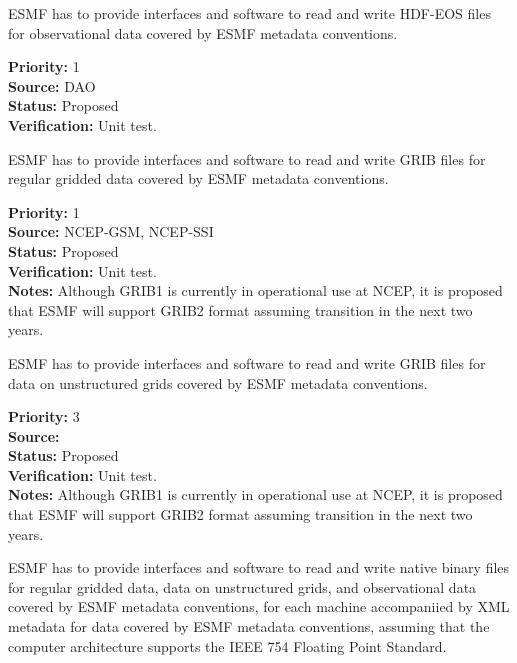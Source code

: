 
ESMF has to provide interfaces and software to read and write HDF-EOS
files for observational data  covered by ESMF metadata conventions.


\begin{reqlist}
{\bf Priority:} 1 \\
{\bf Source:} DAO \\
{\bf Status:} Proposed \\
{\bf Verification:} Unit test. \\
\end{reqlist}




ESMF has to provide interfaces and software to read and write GRIB
files for regular gridded data covered by ESMF metadata conventions.

\begin{reqlist}
{\bf Priority:} 1 \\
{\bf Source:} NCEP-GSM, NCEP-SSI \\
{\bf Status:} Proposed \\
{\bf Verification:} Unit test. \\
{\bf Notes:} Although GRIB1 is currently in operational use at NCEP,
it is proposed that ESMF will support GRIB2 format assuming transition
in the next two years.
\end{reqlist}



ESMF has to provide interfaces and software to read and write GRIB
files for data on unstructured grids covered by ESMF metadata conventions.

\begin{reqlist}
{\bf Priority:} 3 \\
{\bf Source:} \\
{\bf Status:} Proposed \\
{\bf Verification:} Unit test. \\
{\bf Notes:} Although GRIB1 is currently in operational use at NCEP,
it is proposed that ESMF will support GRIB2 format assuming transition
in the next two years.
\end{reqlist}



ESMF has to provide interfaces and software to read and write native
binary files for regular gridded data, data on unstructured grids, and 
observational data  covered by ESMF metadata conventions, for each machine 
accompaniied by XML metadata for data covered by ESMF metadata conventions,
assuming that the computer architecture supports the IEEE 754 Floating
Point Standard. 

